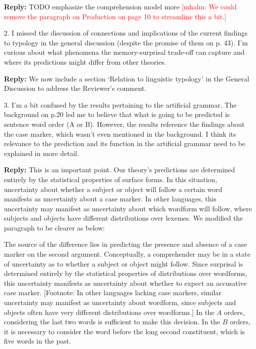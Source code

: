 \documentclass{article}[11pt,a4paper,oneside]
\newcommand\mhahn[1]{\textcolor{red}{[mhahn: #1]}}
\newenvironment{reply}
  {\par\medskip
   \color{blue}%
   \begin{framed}
   \textbf{Reply: }\ignorespaces}
 {\end{framed}
  \medskip}
\begin{document}
\begin{reply}
	TODO emphasize the comprehension model more \mhahn{We could remove the paragraph on Production on page 10 to streamline this a bit.}
\end{reply}

2. I missed the discussion of connections and implications of the current findings to typology in the general discussion (despite the promise of them on p. 43). I'm curious about what phenomena the memory-surprisal trade-off can capture and where its predictions might differ from other theories.

\begin{reply}
	We now include a section `Relation to linguistic typology' in the General Discussion to address the Reviewer's comment. 
\end{reply}

3. I'm a bit confused by the results pertaining to the artificial grammar. The background on p.20 led me to believe that what is going to be predicted is sentence word order (A or B). However, the results reference the findings about the case marker, which wasn't even mentioned in the background. I think its relevance to the prediction and its function in the artificial grammar need to be explained in more detail.

\begin{reply}
	This is an important point. Our theory's predictions are determined entirely by the statistical properties of surface forms. In this situation, uncertainty about whether a subject or object will follow a certain word manifests as uncertainty about a case marker. In other languages, this uncertainty may manifest as uncertainty about which wordform will follow, where subjects and objects have different distributions over lexemes. We modified the paragraph to be clearer as below:
	
	The source of the difference lies in predicting the presence and absence of a case marker on the second argument.
Conceptually, a comprehender may be in a state of uncertainty as to whether a subject or object might follow.
Since surprisal is determined entirely by the statistical properties of distributions over wordforms, this uncertainty manifests as uncertainty about whether to expect an accusative case marker.
[Footnote: In other languages lacking case markers, similar uncertainty may manifest as uncertainty about wordform, since subjects and objects often have very different distributions over wordforms.]
In the $A$ orders, considering the last two words is sufficient to make this decision.
In the $B$ orders, it is necessary to consider the word before the long second constituent, which is five words in the past.
\end{reply}
\end{document}
